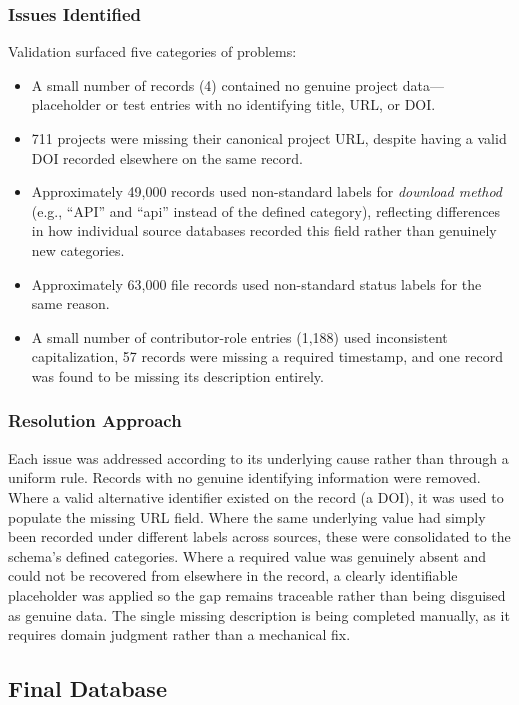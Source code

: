 \subsubsection{Issues Identified}
Validation surfaced five categories of problems:
\begin{itemize}
    \item A small number of records (4) contained no genuine project data---placeholder or test entries with no identifying title, URL, or DOI.
    \item 711 projects were missing their canonical project URL, despite having a valid DOI recorded elsewhere on the same record.
    \item Approximately 49{,}000 records used non-standard labels for \textit{download method} (e.g., ``API'' and ``api'' instead of the defined category), reflecting differences in how individual source databases recorded this field rather than genuinely new categories.
    \item Approximately 63{,}000 file records used non-standard status labels for the same reason.
    \item A small number of contributor-role entries (1{,}188) used inconsistent capitalization, 57 records were missing a required timestamp, and one record was found to be missing its description entirely.
\end{itemize}

\subsubsection{Resolution Approach}
Each issue was addressed according to its underlying cause rather than through a uniform rule. Records with no genuine identifying information were removed. Where a valid alternative identifier existed on the record (a DOI), it was used to populate the missing URL field. Where the same underlying value had simply been recorded under different labels across sources, these were consolidated to the schema's defined categories. Where a required value was genuinely absent and could not be recovered from elsewhere in the record, a clearly identifiable placeholder was applied so the gap remains traceable rather than being disguised as genuine data. The single missing description is being completed manually, as it requires domain judgment rather than a mechanical fix.

\subsection{Final Database}

